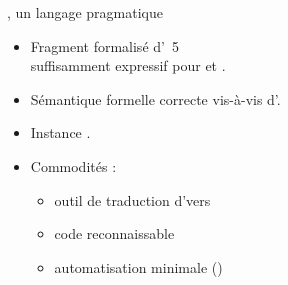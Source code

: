 \begin{frame}{\Zoo, un langage pragmatique}
\centering
\Large
\begin{itemize}
  \item Fragment formalisé d'\OCaml~5 \\ suffisamment expressif pour \Saturn et \Kcas.
  \item Sémantique formelle correcte vis-à-vis d'\OCaml.
  \setlength\itemsep{1.5em}
  \item Instance \Iris.
  \item Commodités :
    \begin{itemize}
      \normalsize
      \item outil de traduction d'\OCaml vers \Zoo
      \item code reconnaissable
      \item automatisation minimale (\Diaframe)
    \end{itemize}
\end{itemize}
\end{frame}
